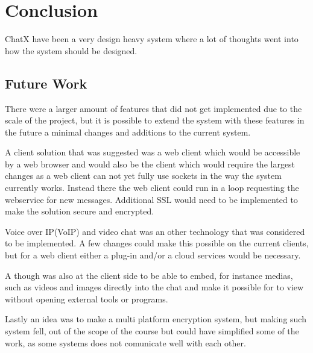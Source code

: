\chapter{Conclusion}

ChatX have been a very design heavy system where a lot of thoughts went into how the system should be designed.

\section{Future Work}

There were a larger amount of features that did not get implemented due to the scale of the project, but it is possible to extend the system with these features in the future a minimal changes and additions to the current system.

A client solution that was suggested was a web client which would be accessible by a web browser and would also be the client which would require the largest changes as a web client can not yet fully use sockets in the way the system currently works. Instead there the web client could run in a loop requesting the webservice for new messages. Additional SSL would need to be implemented to make the solution secure and encrypted.

Voice over IP(VoIP) and video chat was an other technology that was considered to be implemented. A few changes could make this possible on the current clients, but for a web client either a plug-in and/or a cloud services would be necessary. 

A though was also at the client side to be able to embed, for instance medias, such as videos and images directly into the chat and make it possible for to view without opening external tools or programs.

Lastly an idea was to make a multi platform encryption system, but making such system fell, out of the scope of the course but could have simplified some of the work, as some systems does not comunicate well with each other.
